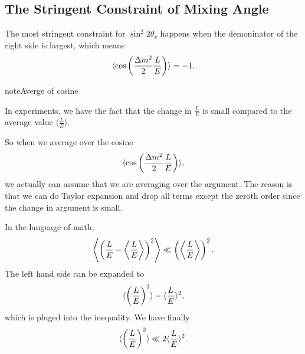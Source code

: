 \documentclass[letterpaper,12pt,english]{sphinxmanual}
\begin{document}
\subsection{The Stringent Constraint of Mixing Angle}
\label{experiments:the-stringent-constraint-of-mixing-angle}
The most stringent constraint for \(\sin^2 2\theta_v\) happens when the demoninator of the right side is largest, which means
\begin{gather}
\begin{split}\langle \cos \left( \frac{\Delta m^2}{2} \frac{L}{E}  \right) \rangle = -1.\end{split}\notag
\end{gather}
\begin{notice}{note}{Averge of cosine}

In experiments, we have the fact that the change in \(\frac{L}{E}\) is small compared to the average value \(\langle\frac{L}{E}\rangle\).

So when we average over the cosine
\begin{gather}
\begin{split}\langle \cos \left( \frac{\Delta m^2}{2} \frac{L}{E}  \right) \rangle,\end{split}\notag
\end{gather}
we actually can assume that we are averaging over the argument. The reason is that we can do Taylor expansion and drop all terms except the zeroth order since the change in argument is small.

In the language of math,
\begin{gather}
\begin{split}\left\langle  \left( \frac{L}{E} - \left\langle \frac{L}{E} \right\rangle  \right)^2 \right\rangle \ll \left( \left\langle \frac{L}{E} \right\rangle  \right)^2.\end{split}\notag
\end{gather}
The left hand side can be expanded to
\begin{gather}
\begin{split}\langle \left(\frac{L}{E} \right)^2 \rangle - \langle \frac{L}{E}\rangle^2,\end{split}\notag
\end{gather}
which is pluged into the inequality. We have finally
\begin{gather}
\begin{split}\langle \left(\frac{L}{E} \right)^2 \rangle \ll 2\langle \frac{L}{E}\rangle^2.\end{split}\notag
\end{gather}\end{notice}
\end{document}
